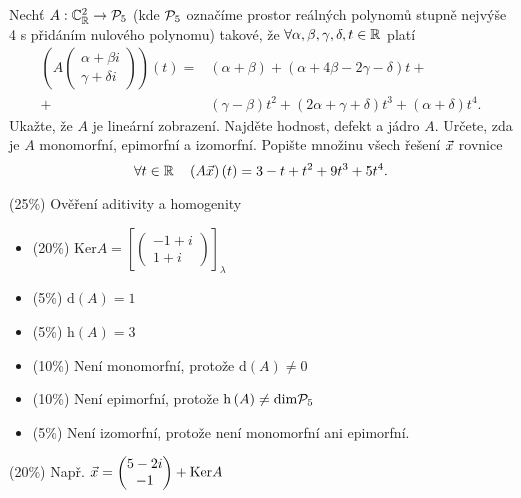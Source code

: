 \documentclass{article}
\newcommand{\mathdim}{\ensuremath{\mathrm{dim}}}
\newcommand{\mathfield}{\ensuremath{\mathbb}}
\newcommand{\mathkernel}{\ensuremath{\mathrm{Ker}}}
\newcommand{\mathnull}[1]{\ensuremath{\mathrm{d} \left( #1 \right)}}
\newcommand{\mathrank}[1]{\ensuremath{\mathrm{h} \left( #1 \right)}}
\newcommand{\mathspace}{\ensuremath{\mathcal}}
\newcommand{\mathvec}{\ensuremath{\vec}}
\begin{document}
\begin{Exercise}[name=Úkol, label=linear-maps]
	Nechť \( A : \mathfield{C}^2_\mathfield{R} \to \mathspace{P}_5 \) (kde \( \mathspace{P}_5 \) označíme prostor reálných polynomů stupně nejvýše 4 s přidáním nulového polynomu) takové, že \( \forall \alpha, \beta, \gamma, \delta, t \in \mathfield{R} \) platí
	\[
		\begin{aligned}
			 \left( A \begin{pmatrix} \alpha + \beta i \\ \gamma + \delta i \end{pmatrix} \right) \left( t \right) = &\left( \alpha + \beta \right) + \left( \alpha + 4\beta - 2\gamma - \delta \right) t + \\
			+ &\left( \gamma - \beta \right) t^2 + \left( 2\alpha + \gamma + \delta \right) t^3 + \left( \alpha + \delta \right) t^4 \text{.}
		\end{aligned}
	\]
	\Question Ukažte, že \( A \) je lineární zobrazení.
	\Question Najděte hodnost, defekt a jádro \( A \).
	\Question Určete, zda je \( A \) monomorfní, epimorfní a izomorfní.
	\Question Popište množinu všech řešení \( \mathvec{x} \) rovnice
	\[
		\forall t \in \mathfield{R} \quad \left( A \mathvec{x} \right) \left( t \right) = 3 - t + t^2 + 9t^3 + 5t^4 \text{.}
	\]
\end{Exercise}

\begin{Answer}[ref=linear-maps]
	\Question (25\%) \quad Ověření aditivity a homogenity
	\Question \begin{itemize}
		\item (20\%) \quad \( \mathkernel{A} = \left[ \begin{pmatrix} -1 + i \\ 1 + i \end{pmatrix} \right]_\lambda \)
		\item (5\%) \quad \( \mathnull{A} = 1 \)
		\item (5\%) \quad \( \mathrank{A} = 3 \)
	\end{itemize}
	\Question \begin{itemize}
		\item (10\%) \quad Není monomorfní, protože \( \mathnull{A} \neq 0 \)
		\item (10\%) \quad Není epimorfní, protože \( \mathrank{A} \neq \mathdim{\mathspace{P}_5} \)
		\item (5\%) \quad Není izomorfní, protože není monomorfní ani epimorfní.
	\end{itemize}
	\Question (20\%) \quad Např. \( \mathvec{x} = \begin{pmatrix} 5 - 2i \\ -1 \end{pmatrix} + \mathkernel{A} \)
\end{Answer}
\end{document}
